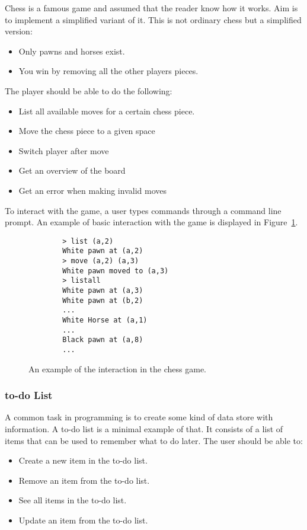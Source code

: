 \documentclass[12pt]{article}
\theoremstyle{definition}
\theoremstyle{theorem}
\begin{document}
Chess is a famous game and assumed that the reader know how it works. Aim
is to implement a simplified variant of it. This is not ordinary chess but a
simplified version:

\begin{itemize} 
    \item Only pawns and horses exist.
    \item You win by removing all the other players pieces.
\end{itemize}

The player should be able to do the following:

\begin{itemize} 
    \item List all available moves for a certain chess piece. 
    \item Move the chess piece to a given space
    \item Switch player after move
    \item Get an overview of the board
    \item Get an error when making invalid moves
\end{itemize}

To interact with the game, a user types commands through a command line prompt.
An example of basic interaction with the game is displayed in
Figure~\ref{chessexample}.

\begin{figure}[H]
    \centering
    \begin{lstlisting}
        > list (a,2)
        White pawn at (a,2)
        > move (a,2) (a,3)
        White pawn moved to (a,3)
        > listall
        White pawn at (a,3)
        White pawn at (b,2)
        ...
        White Horse at (a,1)
        ...
        Black pawn at (a,8)
        ...
    \end{lstlisting}
    \label{chessexample}
    \caption{An example of the interaction in the chess game.}
\end{figure}


\subsubsection{to-do List}

A common task in programming is to create some kind of data store with
information. A to-do list is a minimal example of that. It consists of a list of
items that can be used to remember what to do later. The user should be able to:

\begin{itemize}
    \item Create a new item in the to-do list.
    \item Remove an item from the to-do list.
    \item See all items in the to-do list.
    \item Update an item from the to-do list.
\end{itemize}
\end{document}
